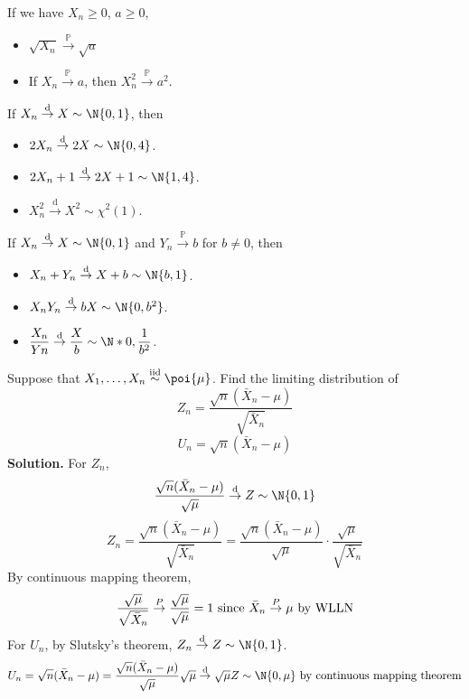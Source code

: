 \begin{Example}{}{}
    If we have $ X_n\ge 0 $, $ a\ge 0 $,
    \begin{itemize}
        \item $ \sqrt{X_n}\stackrel{\mathbb{P}}{\to}\sqrt{a} $
        \item If $ X_n \stackrel{\mathbb{P}}{\to} a $, then
              $ X_n^2\stackrel{\mathbb{P}}{\to}a^2 $.
    \end{itemize}

    If $ X_n\stackrel{\text{d}}{\to}X \sim \N{0,1} $, then
    \begin{itemize}
        \item $ 2X_n\stackrel{\text{d}}{\to}2X\sim\N{0,4} $.
        \item $ 2X_n+1\stackrel{\text{d}}{\to}2X+1\sim\N{1,4} $.
        \item $ X_n^2\stackrel{\text{d}}{\to} X^2 \sim \chi^2(1) $.
    \end{itemize}

    If $ X_n\stackrel{\text{d}}{\to}X \sim \N{0,1} $
    and $ Y_n\stackrel{\mathbb{P}}{\to}b $ for $ b\neq 0 $, then
    \begin{itemize}
        \item $ X_n+Y_n\stackrel{\text{d}}{\to}X+b \sim \N{b,1} $.
        \item $ X_n Y_n \stackrel{\text{d}}{\to}bX \sim \N{0,b^2} $.
        \item $ \displaystyle \frac{X_n}{Yn} \stackrel{\text{d}}{\to}
                  \frac{X}{b}\sim \N*{0,\frac{1}{b^2}} $.
    \end{itemize}
\end{Example}
\begin{Example}{}{}
    Suppose that $ X_1,\ldots,X_n\stackrel{\text{iid}}{\sim}\poi{\mu} $.
    Find the limiting distribution of
    \[ Z_n=\frac{\sqrt{n}(\bar{X}_n-\mu)}{\sqrt{\bar{X}_n}}  \]
    \[ U_n=\sqrt{n}(\bar{X}_n-\mu) \]
    \textbf{Solution.} For $ Z_n $,
    \[ \frac{\sqrt{n}(\bar{X}_n-\mu)}{\sqrt{\mu}}\stackrel{\text{d}}{\to}Z
        \sim \N{0,1}  \]
    \[ Z_n=\frac{\sqrt{n}(\bar{X}_n-\mu)}{\sqrt{\bar{X}_n}}=
        \frac{\sqrt{n}(\bar{X}_n-\mu)}{\sqrt{\mu}}\cdot\frac{\sqrt{\mu}}{\sqrt{\bar{X}_n}}    \]
    By continuous mapping theorem,
    \[ \frac{\sqrt{\mu}}{\sqrt{\bar{X}_n}}\stackrel{\mathbb{P}}{\to}\frac{\sqrt{\mu}}{\sqrt{\mu}}=1
        \text{ since $ \bar{X}_n\stackrel{\mathbb{P}}{\to}\mu $ by WLLN} \]
    For $ U_n $, by Slutsky's theorem, $ Z_n\stackrel{\text{d}}{\to}Z \sim \N{0,1} $.
    \[ U_n=\sqrt{n}(\bar{X}_n-\mu)=\frac{\sqrt{n}(\bar{X}_n-\mu)}{\sqrt{\mu}}\sqrt{\mu}
        \stackrel{\text{d}}{\to}\sqrt{\mu}Z \sim \N{0,\mu}\text{ by
            continuous mapping theorem}  \]
\end{Example}
